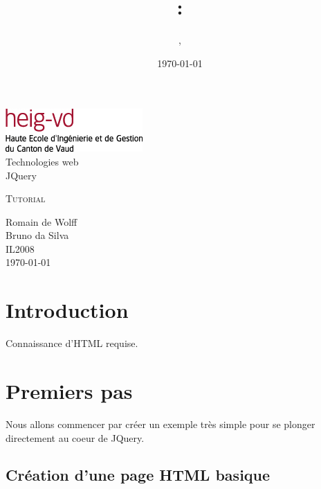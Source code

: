 \documentclass[10pt,a4paper,titlepage]{article}
\author{\auteurOne, \auteurTwo}
\title{\branchetag : \laboname}
\date{\today}
\newcommand{\branche}{Technologies web}
\newcommand{\laboname}{JQuery}
\newcommand{\auteurOne}{Romain de Wolff}
\newcommand{\auteurTwo}{Bruno da Silva}
\newcommand{\promo}{IL2008}
\begin{document}
\pagestyle{headings}
\begin{titlepage}
	\begin{center}
	\includegraphics{img/logo-HEIG-VD.jpg}\\
		\vspace{3cm}
		\LARGE \branche %
		\vspace{3cm}\\
		\Huge \laboname \\
		\vspace{3cm}

		\Large \textsc{Tutorial} \\
		\vspace{3cm}

		\large \auteurOne \\
		\auteurTwo \\	
		\vspace{10pt}
		\normalsize \textsc{\promo} \\

		\vspace{2cm}
		\today
	\end{center}
\end{titlepage}

\tableofcontents

\newpage
\pagestyle{fancy}
\section{Introduction}

Connaissance d'HTML requise.

\newpage

\section{Premiers pas}

Nous allons commencer par créer un exemple très simple pour se plonger directement  au coeur de JQuery.

\subsection{Création d'une page HTML basique}
\end{document}

